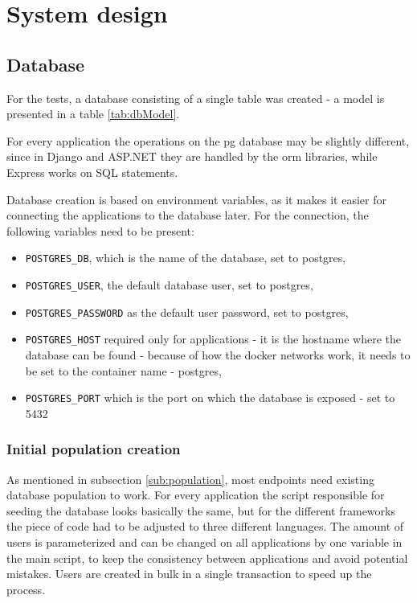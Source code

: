 
\chapter{System design}\label{cha:systemDesign}

\section{Database}\label{sec:pgDbVars}

For the tests, a database consisting of a single table was created - a model is presented in a table \ref{tab:dbModel}.



For every application the operations on the \acrlong{pg} database may be slightly different, since in Django and ASP.NET they are handled by the \acrlong{orm} libraries, while Express works on SQL statements.

Database creation is based on environment variables, as it makes it easier for connecting the applications to the database later. For the connection, the following variables need to be present:
\begin{itemize}
    \item \lstinline{POSTGRES_DB}, which is the name of the database, set to postgres,
    \item \lstinline{POSTGRES_USER}, the default database user, set to postgres,
    \item \lstinline{POSTGRES_PASSWORD} as the default user password, set to postgres,
    \item \lstinline{POSTGRES_HOST} required only for applications - it is the hostname where the database can be found - because of how the docker networks work, it needs to be set to the container name - postgres,
    \item \lstinline{POSTGRES_PORT} which is the port on which the database is exposed - set to 5432
\end{itemize}

\subsection{Initial population creation}

As mentioned in subsection \ref{sub:population}, most endpoints need existing database population to work. For every application the script responsible for seeding the database looks basically the same, but for the different frameworks the piece of code had to be adjusted to three different languages. The amount of users is parameterized and can be changed on all applications by one variable in the main script, to keep the consistency between applications and avoid potential mistakes. Users are created in bulk in a single transaction to speed up the process.

